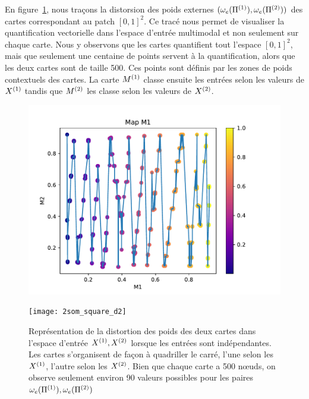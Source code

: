\documentclass[../main]{subfiles}
\begin{document}
En figure~\ref{fig:2som_p_d}, nous traçons la distorsion des poids externes $(\omega_e(\Pi^{({1})}), \omega_e(\Pi^{({2})}))$ des cartes correspondant au patch $[0,1]^2$. Ce tracé nous permet de visualiser la quantification vectorielle dans l'espace d'entrée multimodal et non seulement sur chaque carte. 
Nous y observons que les cartes quantifient tout l'espace $[0,1]^2$, mais que seulement une centaine de points servent à la quantification, alors que les deux cartes sont de taille 500. Ces points sont définis par les zones de poids contextuels des cartes. La carte $M^{({1})}$ classe ensuite les entrées selon les valeurs de $X^{({1})}$ tandis que $M^{({2})}$ les classe selon les valeurs de $X^{({2})}$. 
\begin{figure}[t]
	\begin{minipage}{0.48\textwidth}
		\includegraphics[width=\textwidth]{2som_square_d}
	\end{minipage}
	\begin{minipage}{0.48\textwidth}
		\texttt{[image: 2som\_square\_d2]}
	\end{minipage}
	\caption{Représentation de la distortion des poids des deux cartes dans l'espace d'entrée $X^{({1})}, X^{({2})}$ lorsque les entrées sont indépendantes. Les cartes s'organisent de façon à quadriller le carré, l'une selon les $X^{({1})}$, l'autre selon les $X^{({2})}$. Bien que chaque carte a 500 n\oe{}uds, on observe seulement environ 90 valeurs possibles pour les paires $\omega_e(\Pi^{({1})}),\omega_e(\Pi^{({2})})$ \label{fig:2som_p_d}}
\end{figure}
\end{document}
